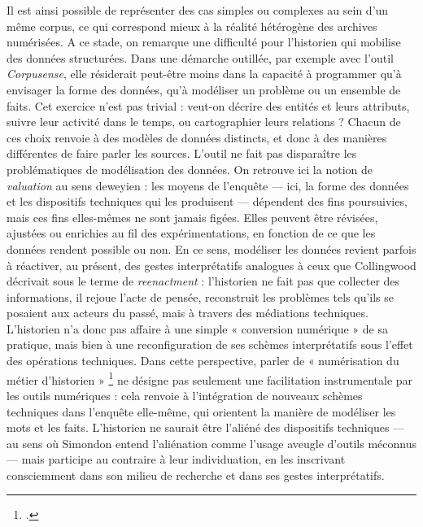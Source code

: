 Il est ainsi possible de représenter des cas simples ou complexes au sein d’un même corpus, ce qui correspond mieux à la réalité hétérogène des archives numérisées. A ce stade, on remarque une difficulté pour l'historien qui mobilise des données structurées. Dans une démarche outillée, par exemple avec l'outil \emph{Corpusense}, elle résiderait peut-être moins dans la capacité à programmer qu'à envisager la forme des données, qu'à modéliser un problème ou un ensemble de faits. Cet exercice n’est pas trivial : veut-on décrire des entités et leurs attributs, suivre leur activité dans le temps, ou cartographier leurs relations ? Chacun de ces choix renvoie à des modèles de données distincts, et donc à des manières différentes de faire parler les sources. L'outil ne fait pas disparaître les problématiques de modélisation des données. On retrouve ici la notion de \emph{valuation} au sens deweyien : les moyens de l’enquête — ici, la forme des données et les dispositifs techniques qui les produisent — dépendent des fins poursuivies, mais ces fins elles-mêmes ne sont jamais figées. Elles peuvent être révisées, ajustées ou enrichies au fil des expérimentations, en fonction de ce que les données rendent possible ou non. En ce sens, modéliser les données revient parfois à réactiver, au présent, des gestes interprétatifs analogues à ceux que Collingwood décrivait sous le terme de \emph{reenactment} : l’historien ne fait pas que collecter des informations, il rejoue l’acte de pensée, reconstruit les problèmes tels qu’ils se posaient aux acteurs du passé, mais à travers des médiations techniques. L’historien n’a donc pas affaire à une simple « conversion numérique » de sa pratique, mais bien à une reconfiguration de ses schèmes interprétatifs sous l’effet des opérations techniques. Dans cette perspective, parler de « numérisation du métier d’historien » \footcite[][]{poublanc} ne désigne pas seulement une facilitation instrumentale par les outils numériques : cela renvoie à l’intégration de nouveaux schèmes techniques dans l’enquête elle-même, qui orientent la manière de modéliser les mots et les faits. L’historien ne saurait être l'aliéné des dispositifs techniques — au sens où Simondon entend l’aliénation comme l’usage aveugle d’outils méconnus — mais participe au contraire à leur individuation, en les inscrivant consciemment dans son milieu de recherche et dans ses gestes interprétatifs. 

